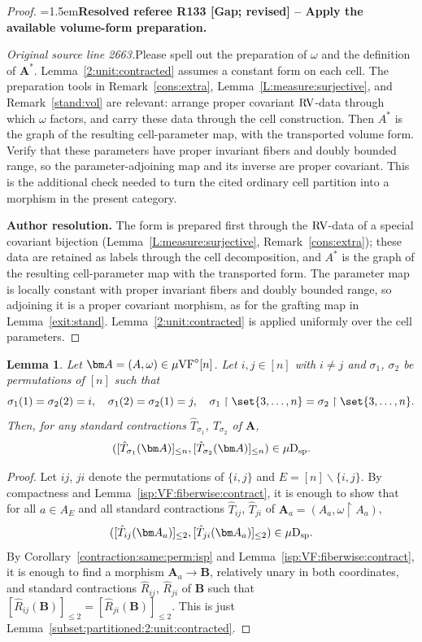\documentclass[12pt]{amsart}
\newcommand{\ResolvedRefereeRemark}[5]{%
  \par\medskip\begingroup\normalfont\small\color{gray}%
  \emergencystretch=1.5em\noindent\textbf{Resolved referee R#1 [#2] -- #3.}\par\nobreak\noindent #4\par
  \medskip\color{ResolutionGreen}\noindent\textbf{Author resolution.} #5\par
  \endgroup\medskip
}
\theoremstyle{plain}
\newtheorem{lem}[thm]{Lemma}
\theoremstyle{definition}
\theoremstyle{remark}
\numberwithin{equation}{section}
\theoremstyle{plain}
\newcommand{\VF}{\textup{VF}}
\newcommand{\RV}{\textup{RV}}
\newcommand{\0}{\emptyset}
\newcommand{\rest}{\upharpoonright}
\newcommand{\fun}{\longrightarrow}
\newcommand{\mi}{\smallsetminus}
\newcommand{\mVF}{{\mu}{\VF}}
\newcommand{\dsp}{\textup{D}_{\textup{sp}}}
\newcommand{\mispdb}{\mu \dsp}
\begin{document}
\begin{proof}
\ResolvedRefereeRemark{133}{Gap; revised}{Apply the available volume-form preparation}{%
\textit{Original source line 2663.}\quad Please spell out the preparation of $\omega$ and the definition of $\bm A^*$. Lemma~\ref{2:unit:contracted} assumes a constant form on each cell. The preparation tools in Remark~\ref{cons:extra}, Lemma~\ref{L:measure:surjective}, and Remark~\ref{stand:vol} are relevant: arrange proper covariant $\RV$-data through which $\omega$ factors, and carry these data through the cell construction. Then $A^*$ is the graph of the resulting cell-parameter map, with the transported volume form. Verify that these parameters have proper invariant fibers and doubly bounded range, so the parameter-adjoining map and its inverse are proper covariant. This is the additional check needed to turn the cited ordinary cell partition into a morphism in the present category.
}{The form is prepared first through the $\RV$-data of a special covariant bijection (Lemma~\ref{L:measure:surjective}, Remark~\ref{cons:extra}); these data are retained as labels through the cell decomposition, and $A^*$ is the graph of the resulting cell-parameter map with the transported form. The parameter map is locally constant with proper invariant fibers and doubly bounded range, so adjoining it is a proper covariant morphism, as for the grafting map in Lemma~\ref{exit:stand}. Lemma~\ref{2:unit:contracted} is applied uniformly over the cell parameters.}
\end{proof}

\begin{lem}\label{contraction:perm:pair:isp}
Let $\bm A = (A, \omega) \in \mVF^\diamond[n]$. Let $i, j \in [n]$ with $i \neq j$ and $\sigma_1$, $\sigma_2$ be  permutations of $[n]$ such that
\[
\sigma_1(1) = \sigma_2(2) = i, \quad \sigma_1(2) = \sigma_2(1) = j, \quad \sigma_1
\rest \set{3, \ldots, n} = \sigma_2 \rest \set{3, \ldots, n}.
\]
Then, for any standard contractions $\hat T_{\sigma_1}$, $\hat T_{\sigma_2}$ of $\bm A$,
\[
([\hat T_{\sigma_1}(\bm A)]_{\leq n}, [\hat T_{\sigma_2}(\bm A)]_{\leq n}) \in \mispdb.
\]
\end{lem}
\begin{proof}
Let $ij$, $ji$ denote the permutations of $\{i, j\}$ and $E = [n] \mi \{i, j\}$. By compactness and
Lemma~\ref{isp:VF:fiberwise:contract}, it is enough to show
that for  all $a \in A_E$ and all standard
contractions $\hat T_{ij}$, $\hat T_{ji}$ of $\bm A_a = (A_a, \omega \rest A_a)$,
\[
([\hat T_{ij}(\bm A_a)]_{\leq 2}, [\hat T_{ji}(\bm A_a)]_{\leq 2})
\in \mispdb.
\]
By Corollary~\ref{contraction:same:perm:isp} and Lemma~\ref{isp:VF:fiberwise:contract}, it is enough to find a morphism $\bm A_a \fun \bm B$, relatively unary in both coordinates, and  standard contractions $\hat R_{ij}$, $\hat R_{ji}$ of $\bm B$ such that $[\hat R_{ij}(\bm B)]_{\leq 2} = [\hat R_{ji}(\bm B)]_{\leq 2}$. This is just Lemma~\ref{subset:partitioned:2:unit:contracted}.
\end{proof}
\end{document}
